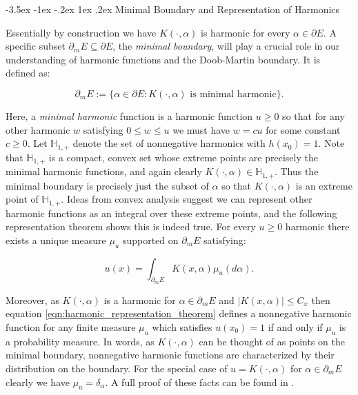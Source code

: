 \documentclass[11pt,oneside,reqno]{article}
\makeatletter
\theoremstyle{plain}
\theoremstyle{definition}
\numberwithin{equation}{section}
\def\subsection#1{\@startsection {subsection}{2}{0pt}%
{-3.5ex \@plus -1ex \@minus -.2ex}%
{1ex \@plus.2ex}%
{\bf\mathversion{bold}}{#1}}
\renewcommand{\cite}{\citet}
\renewcommand{\leq}{\leqslant}
\renewcommand{\geq}{\geqslant}
\newcommand{\Hn}{\mathbb{H}_{1,+}} %
\makeatother
\begin{document}
\subsection{Minimal Boundary and Representation of Harmonics}

\noindent Essentially by construction we have $K(\cdot, \alpha)$ is harmonic for every $\alpha \in \partial E$. 
\noindent A specific subset  $\partial_m E \subseteq \partial E$, the \textit{minimal boundary}, will play a crucial role in our understanding of harmonic functions and the Doob-Martin boundary. It is defined as:

\begin{equation}
    \partial_m E := \{ \alpha \in \partial E : K(\cdot, \alpha) \text{ is minimal harmonic}\}.
\end{equation}

\noindent Here, a \textit{minimal harmonic} function is a harmonic function $u \geq 0$ so that for any other harmonic $w$ satisfying $0 \leq w \leq u$ we must have $w = c u$ for some constant $c \geq 0$.
%
Let $\Hn$ denote the set of nonnegative harmonics with $h(x_0) = 1$. Note that $\Hn$ is a compact, convex set whose extreme points are precisely the minimal harmonic functions, and again clearly $K(\cdot, \alpha) \in \Hn$. Thus the minimal boundary is precisely just the subset of $\alpha$ so that $K(\cdot, \alpha)$ is an extreme point of $\Hn$. Ideas from convex analysis suggest we can represent other harmonic functions as an integral over these extreme points, and the following representation theorem shows this is indeed true. For every $u \geq 0$ harmonic there exists a unique measure $\mu_u$ supported on $\partial_m E$ satisfying:

\begin{equation}
    u(x) = \int_{\partial_m E} K(x, \alpha) \mu_u(d\alpha).
    \label{eqn:harmonic_representation_theorem}
\end{equation}

\noindent Moreover, as $K(\cdot, \alpha)$ is a harmonic for $\alpha \in \partial_m E$ and $|K(x, \alpha)| \leq C_x$ then equation \eqref{eqn:harmonic_representation_theorem} defines a nonnegative harmonic function for any finite measure $\mu_u$ which satisfies $u(x_0) = 1$ if and only if $\mu_u$ is a probability measure. In words, as $K(\cdot, \alpha)$ can be thought of as points on the minimal boundary, nonnegative harmonic functions are characterized by their distribution on the boundary. For the special case of $u = K(\cdot, \alpha)$ for $\alpha \in \partial_m E$ clearly we have $\mu_{u} = \delta_\alpha$. A full proof of these facts can be found in \cite{sawyerMB}.\\
\end{document}
